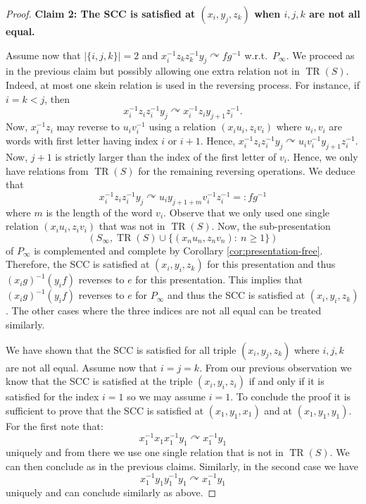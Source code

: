 \documentclass[a4paper, 12pt]{amsart}
\numberwithin{equation}{section}
\theoremstyle{definition}
\newcommand{\act}{\curvearrowright}
\DeclareMathOperator{\TR}{TR}
\begin{document}
\begin{proof}
{\bf Claim 2: The SCC is satisfied at $(x_i,y_j,z_k)$ when $i,j,k$ are not all equal.}

Assume now that $|\{i,j,k\}|=2$ and $x_i^{-1} z_k z_k^{-1} y_j\act fg^{-1}$ w.r.t.~$P_\infty$.
We proceed as in the previous claim but possibly allowing one extra relation not in $\TR(S)$.
Indeed, at most one skein relation is used in the reversing process.
For instance, if $i=k<j$, then
$$x_i^{-1} z_i z_i^{-1} y_j\act x_i^{-1} z_i y_{j+1} z_i^{-1}.$$
Now, $x_i^{-1}z_i$ may reverse to $u_iv_i^{-1}$ using a relation $(x_iu_i,z_iv_i)$ where $u_i,v_i$ are words with first letter having index $i$ or $i+1$.
Hence, $x_i^{-1} z_i z_i^{-1} y_j\act u_iv_i^{-1}y_{j+1} z_i^{-1}.$
Now, $j+1$ is strictly larger than the index of the first letter of $v_i$.
Hence, we only have relations from $\TR(S)$ for the remaining reversing operations.
We deduce that $$x_i^{-1} z_i z_i^{-1} y_j\act u_iy_{j+1+m} v_i^{-1} z_i^{-1}=:fg^{-1}$$
where $m$ is the length of the word $v_i$.
Observe that we only used one single relation $(x_iu_i,z_iv_i)$ that was not in $\TR(S)$.
Now, the sub-presentation 
$$(S_\infty, \TR(S)\cup \{ (x_nu_n,z_nv_n):\ n\geq 1\})$$
of $P_\infty$ is complemented and complete by Corollary \ref{cor:presentation-free}.
Therefore, the SCC is satisfied at $(x_i,y_i,z_k)$ for this presentation and thus $(x_ig)^{-1}(y_i f)$ reverses to $e$ for this presentation.
This implies that $(x_ig)^{-1}(y_i f)$ reverses to $e$ for $P_\infty$ and thus the SCC is satisfied at $(x_i,y_i,z_k)$.
The other cases where the three indices are not all equal can be treated similarly.

We have shown that the SCC is satisfied for all triple $(x_i,y_j,z_k)$ where $i,j,k$ are not all equal.
Assume now that $i=j=k$. From our previous observation we know that the SCC is satisfied at the triple $(x_i,y_i,z_i)$ if and only if it is satisfied for the index $i=1$ so we may assume $i=1$.
To conclude the proof it is sufficient to prove that the SCC is satisfied at $(x_1,y_1,x_1)$ and at $(x_1,y_1,y_1)$.
For the first note that:
$$x_1^{-1} x_1 x_1^{-1}y_1 \act x_1^{-1} y_1$$
uniquely and from there we use one single relation that is not in $\TR(S)$.
We can then conclude as in the previous claims.
Similarly, in the second case we have
$$x_1^{-1}y_1 y_1^{-1}y_1\act x_1^{-1} y_1$$
uniquely and can conclude similarly as above.
\end{proof}

\end{document}
